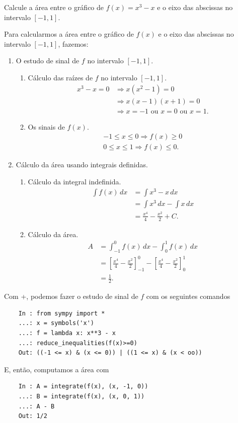 \begin{exeresol}
  Calcule a área entre o gráfico de $f(x) = x^3-x$ e o eixo das abscissas no intervalo $[-1,1]$.
\end{exeresol}
\begin{resol}
  Para calcularmos a área entre o gráfico de $f(x)$ e o eixo das abscissas no intervalo $[-1,1]$, fazemos:
  \begin{enumerate}[1.]
  \item O estudo de sinal de $f$ no intervalo $[-1,1]$.
    \begin{enumerate}
    \item Cálculo das raízes de $f$ no intervalo $[-1,1]$.
      \begin{align}
        x^3-x=0 &\Rightarrow x(x^2-1)=0\\
                &\Rightarrow x(x-1)(x+1)=0\\
                &\Rightarrow x=-1\text{ ou }x=0\text{ ou }x=1.
      \end{align}
    \item Os sinais de $f(x)$.
      \begin{align}
        -1\leq x \leq 0 \Rightarrow f(x)\geq 0\\
        0\leq x \leq 1 \Rightarrow f(x)\leq 0.
      \end{align}
    \end{enumerate}
  \item Cálculo da área usando integrais definidas.
    \begin{enumerate}
    \item Cálculo da integral indefinida.
      \begin{align}
        \int f(x)\,dx &= \int x^3-x\,dx\\
                      &= \int x^3\,dx - \int x\,dx\\
                      &= \frac{x^4}{4} - \frac{x^2}{2} + C.
      \end{align}
    \item Cálculo da área.
    \begin{align}
      A &= \int_{-1}^0 f(x)\,dx - \int_{0}^{1} f(x)\,dx \\
        &= \left[\frac{x^4}{4} - \frac{x^2}{2}\right]_{-1}^0 - \left[\frac{x^4}{4} - \frac{x^2}{2}\right]_{0}^1\\
        &= \frac{1}{2}.
    \end{align}
    \end{enumerate}
  \end{enumerate}

  \ifispython
  Com {\python}+{\sympy}, podemos fazer o estudo de sinal de $f$ com os seguintes comandos
  \begin{lstlisting}
    In : from sympy import *
    ...: x = symbols('x')
    ...: f = lambda x: x**3 - x
    ...: reduce_inequalities(f(x)>=0)
    Out: ((-1 <= x) & (x <= 0)) | ((1 <= x) & (x < oo))
  \end{lstlisting}
  E, então, computamos a área com
  \begin{lstlisting}
    In : A = integrate(f(x), (x, -1, 0)) 
    ...: B = integrate(f(x), (x, 0, 1))
    ...: A - B
    Out: 1/2 
  \end{lstlisting}
  \fi
\end{resol}

